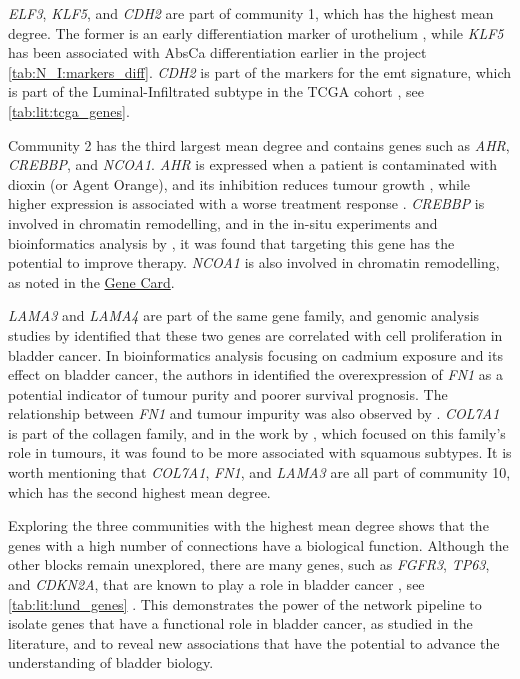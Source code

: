 \textit{ELF3}, \textit{KLF5}, and \textit{CDH2} are part of community 1, which has the highest mean degree. The former is an early differentiation marker of urothelium \citep{Bock2014-zy}, while \textit{KLF5} has been associated with AbsCa differentiation earlier in the project \cref{tab:N_I:markers_diff}. \textit{CDH2} is part of the markers for the \acrfull{emt} signature, which is part of the Luminal-Infiltrated subtype in the TCGA cohort \citep{Robertson2017-mg}, see \cref{tab:lit:tcga_genes}.

Community 2 has the third largest mean degree and contains genes such as \textit{AHR}, \textit{CREBBP}, and \textit{NCOA1}. \textit{AHR} is expressed when a patient is contaminated with dioxin (or Agent Orange), and its inhibition reduces tumour growth \citep{d}, while higher expression is associated with a worse treatment response \citep{Ma2023-uu}. \textit{CREBBP} is involved in chromatin remodelling, and in the in-situ experiments and bioinformatics analysis by \citep{Duex2018-qg}, it was found that targeting this gene has the potential to improve therapy. \textit{NCOA1} is also involved in chromatin remodelling, as noted in the \href{https://www.uniprot.org/uniprotkb/Q15788/entry#function}{Gene Card}.

\textit{LAMA3} and \textit{LAMA4} are part of the same gene family, and genomic analysis studies by \citep{Ma2024-xc} identified that these two genes are correlated with cell proliferation in bladder cancer. In bioinformatics analysis focusing on cadmium exposure and its effect on bladder cancer, the authors in \citep{Zhang2023-ul} identified the overexpression of \textit{FN1} as a potential indicator of tumour purity and poorer survival prognosis. The relationship between \textit{FN1} and tumour impurity was also observed by \citep{Zhang2023-kv}. \textit{COL7A1} is part of the collagen family, and in the work by \citep{Guo2023-sf}, which focused on this family's role in tumours, it was found to be more associated with squamous subtypes. It is worth mentioning that \textit{COL7A1}, \textit{FN1}, and \textit{LAMA3} are all part of community 10, which has the second highest mean degree.


Exploring the three communities with the highest mean degree shows that the genes with a high number of connections have a biological function. Although the other blocks remain unexplored, there are many genes, such as \textit{FGFR3}, \textit{TP63}, and \textit{CDKN2A}, that are known to play a role in bladder cancer \citep{Robertson2017-mg,Kamoun2020-tj-ed}, see \cref{tab:lit:lund_genes} \citep{Marzouka2018-ge}. This demonstrates the power of the network pipeline to isolate genes that have a functional role in bladder cancer, as studied in the literature, and to reveal new associations that have the potential to advance the understanding of bladder biology.


